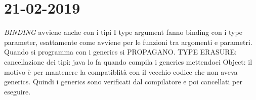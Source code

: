 

\newpage
\section{21-02-2019}
\par


\textit{BINDING} avviene anche con i tipi \newline
I type argument fanno binding con i type parameter, esattamente come avviene per le funzioni tra argomenti e parametri. \newline
Quando si programma con i generics si PROPAGANO. \newline
TYPE ERASURE: cancellazione dei tipi: java lo fa quando compila i generics mettendoci Object: il motivo è per mantenere la compatiblità con il vecchio codice che non aveva generics. Quindi i generics sono verificati dal compilatore e poi cancellati per eseguire.














